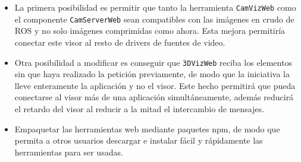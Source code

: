 \begin{itemize}
\item La primera posibilidad es permitir que tanto la herramienta \texttt{CamVizWeb} como el componente \texttt{CamServerWeb} sean compatibles con las imágenes en crudo de ROS y no solo imágenes comprimidas como ahora. Esta mejora permitiría conectar este visor al resto de drivers de fuentes de video.
\item Otra posibilidad a modificar es conseguir que \texttt{3DVizWeb} reciba los elementos sin que haya realizado la petición previamente, de modo que la iniciativa la lleve enteramente la aplicación y no el visor. Este hecho permitirá que pueda conectarse al visor más de una aplicación simultáneamente, además reducirá el retardo del visor al reducir a la mitad el intercambio de mensajes.
\item Empaquetar las herramientas web mediante paquetes npm, de modo que permita a otros usuarios descargar e instalar fácil y rápidamente las herramientas para ser usadas.
\end{itemize}


